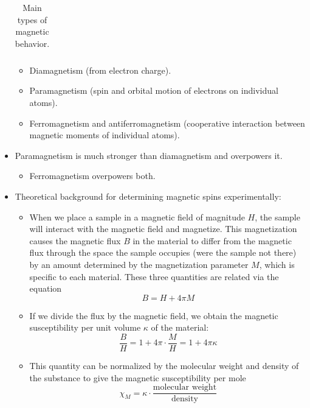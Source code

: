 \documentclass[../notes.tex]{subfiles}
\begin{document}
\begin{itemize}
\begin{table}[h!]
\begin{tabular}{lcllp{5cm}}
            \hline
        \end{tabular}
        \caption{Main types of magnetic behavior.}
        \label{fig:typesOfMagnetism}
    \end{table}
    \begin{itemize}
        \item Diamagnetism (from electron charge).
        \item Paramagnetism (spin and orbital motion of electrons on individual atoms).
        \item Ferromagnetism and antiferromagnetism (cooperative interaction between magnetic moments of individual atoms).
    \end{itemize}
    \item Paramagnetism is much stronger than diamagnetism and overpowers it.
    \begin{itemize}
        \item Ferromagnetism overpowers both.
    \end{itemize}
    \item Theoretical background for determining magnetic spins experimentally:
    \begin{itemize}
        \item When we place a sample in a magnetic field of magnitude $H$, the sample will interact with the magnetic field and magnetize. This magnetization causes the magnetic flux $B$ in the material to differ from the magnetic flux through the space the sample occupies (were the sample not there) by an amount determined by the magnetization parameter $M$, which is specific to each material. These three quantities are related via the equation
        \begin{equation*}
            B = H+4\pi M
        \end{equation*}
        \item If we divide the flux by the magnetic field, we obtain the magnetic susceptibility per unit volume $\kappa$ of the material:
        \begin{equation*}
            \frac{B}{H} = 1+4\pi\cdot\frac{M}{H} = 1+4\pi\kappa
        \end{equation*}
        \item This quantity can be normalized by the molecular weight and density of the substance to give the magnetic susceptibility per mole
        \begin{equation*}
            \chi_M = \kappa\cdot\frac{\text{molecular weight}}{\text{density}}
        \end{equation*}

\end{itemize}
\end{itemize}
\end{document}

